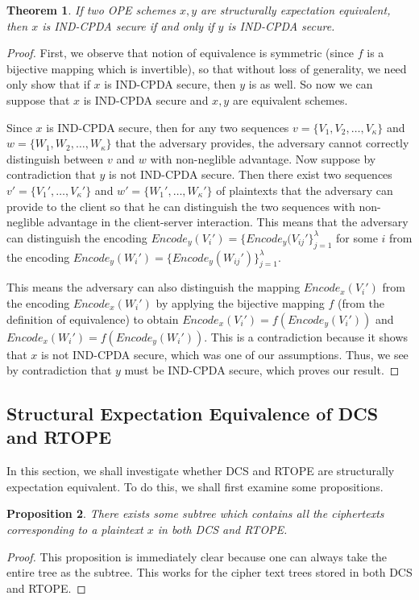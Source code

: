 \documentclass[12pt]{article}
\newtheorem{theorem}{Theorem}[section]
\newtheorem{proposition}[theorem]{Proposition}
\begin{document}
\begin{theorem}
 If two OPE schemes $x,y$ are structurally expectation equivalent, then $x$ is IND-CPDA secure if and only if $y$ is IND-CPDA secure.
\end{theorem}
\begin{proof}
  First, we observe that notion of equivalence is symmetric (since $f$ is a bijective mapping which is invertible), so that without loss of generality, we need only show that if $x$ is IND-CPDA secure, then $y$ is as well. So now we can suppose that $x$ is IND-CPDA secure and $x,y$ are equivalent schemes.

  Since $x$ is IND-CPDA secure, then for any two sequences $v = \{V_1, V_2, \ldots, V_{\kappa}\}$ and $w = \{W_1, W_2, \ldots, W_{\kappa} \}$ that the adversary provides, the adversary cannot correctly distinguish between $v$ and $w$ with non-neglible advantage. Now suppose by contradiction that $y$ is not IND-CPDA secure. Then there exist two sequences $v' = \{V_1', \ldots, V_{\kappa}'\}$ and $w' = \{W_1', \ldots, W_{\kappa}'\}$ of plaintexts that the adversary can provide to the client so that he can distinguish the two sequences with non-neglible advantage in the client-server interaction. This means that the adversary can distinguish the encoding $Encode_y(V_i') = \{Encode_y(V_{ij}' \}_{j=1}^{\lambda}$ for some $i$ from the encoding $Encode_y(W_i') = \{Encode_y(W_{ij}') \}_{j=1}^{\lambda}$.

  This means the adversary can also distinguish the mapping $Encode_x(V_i')$ from the encoding $Encode_x(W_i')$ by applying the bijective mapping $f$ (from the definition of equivalence) to obtain $Encode_x(V_i') = f(Encode_y(V_i'))$ and $Encode_x(W_i') = f(Encode_y(W_i'))$. This is a contradiction because it shows that $x$ is not IND-CPDA secure, which was one of our assumptions. Thus, we see by contradiction that $y$ must be IND-CPDA secure, which proves our result.
\end{proof}

  \subsection{Structural Expectation Equivalence of DCS and RTOPE}

  In this section, we shall investigate whether DCS and RTOPE are structurally expectation equivalent. To do this, we shall first examine some propositions.

\begin{proposition}
  There exists some subtree which contains all the ciphertexts corresponding to a plaintext $x$ in both DCS and RTOPE.
\end{proposition}
\begin{proof}
  This proposition is immediately clear because one can always take the entire tree as the subtree. This works for the cipher text trees stored in both DCS and RTOPE.
\end{proof}
\end{document}
